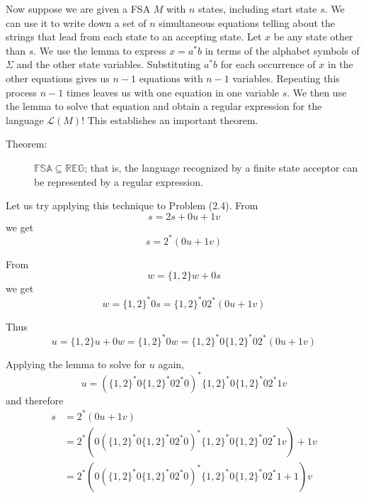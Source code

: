 \documentclass{article}
\newcommand{\El}{\mathcal L}
\begin{document}
Now suppose we are given a FSA $M$ with $n$ states, including start state $s$. We can use it to write down a set of $n$ simultaneous equations telling about the strings that lead from each state to an accepting state. Let $x$ be any state other than $s$. We use the lemma to express $x = a^* b$ in terms of the alphabet symbols of $\Sigma$ and the other state variables. Substituting $a^* b$ for each occurrence of $x$ in the other equations gives us $n-1$ equations with $n-1$ variables. Repeating this process $n-1$ times leaves us with one equation in one variable $s$. We then use the lemma to solve that equation and obtain a regular expression for the language $\El(M)$! This establishes an important theorem. 

\begin{description}
\item[Theorem:] $\mathbb{FSA} \subseteq \mathbb{REG}$; that is, the language recognized by a finite state acceptor can be represented by a regular expression.
\end{description}

Let us try applying this technique to Problem (2.4). From
\begin{equation*}
s = 2s + 0u + 1v
\end{equation*}
we get
\begin{equation*}
s = 2^* (0u + 1v)
\end{equation*}

From
\begin{equation*}
w = \{1,2\} w + 0s
\end{equation*}
we get
\begin{equation*}
w = \{1,2\}^* 0s = \{1,2\}^* 02^* (0u + 1v)
\end{equation*}

Thus
\begin{equation*}
u = \{1,2\} u + 0w = \{1,2\}^* 0w = \{1,2\}^* 0 \{1,2\}^* 02^* (0u + 1v)
\end{equation*}

Applying the lemma to solve for $u$ again,
\begin{equation*}
u = ( \{1,2\}^*0 \{1,2\}^* 02^* 0 )^* \{1,2\}^* 0 \{1,2\}^* 02^* 1v
\end{equation*}
and therefore
\begin{align*}
s & = 2^* (0u+1v) \\
  & = 2^* (0 ( \{1,2\}^* 0 \{1,2\}^* 02^* 0)^* \{1,2\}^* 0 \{1,2\}^* 02^*1v) + 1v \\
  & = 2^* (0 ( \{1,2\}^* 0 \{1,2\}^* 02^* 0)^* \{1,2\}^* 0 \{1,2\}^* 02^* 1 + 1) v
\end{align*}
\end{document}
